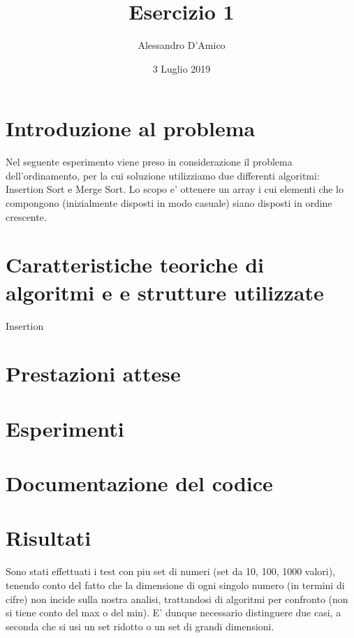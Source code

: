 \documentclass[a4paper]{article}
\title {{\TitleFont Esercizio 1}}
\date{3 Luglio 2019}
\author{{\AuthFont Alessandro D'Amico}}
\begin{document}
\begin{titlingpage}
\maketitle
\end{titlingpage}
\tableofcontents
\newpage
\section{Introduzione al problema}
Nel seguente esperimento viene preso in considerazione il problema dell'ordinamento, per la cui soluzione utilizziamo due differenti algoritmi: Insertion Sort e Merge Sort.
Lo scopo e' ottenere un array i cui elementi che lo compongono (inizialmente disposti in modo casuale) siano disposti in ordine crescente.
\section{Caratteristiche teoriche di algoritmi e e strutture utilizzate}
Insertion
\section{Prestazioni attese}
\section{Esperimenti}
\section{Documentazione del codice}
\newpage
\section{Risultati}
Sono stati effettuati i test con piu set di numeri (set da 10, 100, 1000 valori), tenendo conto del fatto che la dimensione di ogni singolo numero (in termini di cifre) non incide sulla nostra analisi, trattandosi di algoritmi per confronto (non si tiene conto del max o del min). E' dunque necessario distinguere due casi, a seconda che si usi un set ridotto o un set di grandi dimensioni. 
\end{document}
